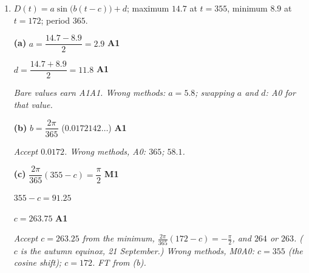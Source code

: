 \documentclass[12pt, twoside]{article}
\begin{document}
\begin{enumerate}[itemsep=0.3cm]
\textbf{(b)} $\dfrac{AD}{\sin 52^\circ} = \dfrac{11.8562\ldots}{\sin 70^\circ}$
\hfill \textbf{M1A1}

$AD = 9.94\,\text{cm}$ \quad ($9.94248\ldots$) \hfill \textbf{A1}

\emph{A1 for pairing $AD$ with $52^\circ$ and $AC$ with $70^\circ$. Accept
any value consistent with the candidate's rounded $AC$, e.g.\ $9.98$ from
$AC = 11.9$. Wrong method: pairing $AD$ with $70^\circ$ gives $14.1$:
M1A0A0. FT from (a).}

\textbf{(c)} $C\hat{A}D = 180^\circ - 52^\circ - 70^\circ = 58^\circ$

$\text{Area } ABC = \frac{1}{2}(8)(6)\sin 115^\circ = 21.7513\ldots$

$\text{Area } ACD = \frac{1}{2}(11.8562\ldots)(9.94248\ldots)\sin 58^\circ
= 49.9843\ldots$ \hfill \textbf{M1}

$\text{Area } ABCD = 21.7513\ldots + 49.9843\ldots$ \hfill \textbf{M1}

$\text{Area } ABCD = 71.7\,\text{cm}^{2}$ \quad ($71.7356\ldots$)
\hfill \textbf{A1}

\emph{As version (a). Accept $72.1$ from $AC = 11.9$ and $AD = 9.98$.
Wrong method: $115^\circ$ in triangle $ACD$ gives $75.2$: M1M1A0. FT from
(a) and (b).}

\newpage

\item[4.] [Maximum mark: 12]

$D(t) = a\sin\bigl(b(t - c)\bigr) + d$; maximum $14.7$ at $t = 355$,
minimum $8.9$ at $t = 172$; period $365$.

\textbf{(a)} $a = \dfrac{14.7 - 8.9}{2} = 2.9$ \hfill \textbf{A1}

$d = \dfrac{14.7 + 8.9}{2} = 11.8$ \hfill \textbf{A1}

\emph{Bare values earn A1A1. Wrong methods: $a = 5.8$; swapping $a$ and
$d$: A0 for that value.}

\textbf{(b)} $b = \dfrac{2\pi}{365}$ \quad ($0.0172142\ldots$) \hfill \textbf{A1}

\emph{Accept $0.0172$. Wrong methods, A0: $365$; $58.1$.}

\textbf{(c)} $\dfrac{2\pi}{365}(355 - c) = \dfrac{\pi}{2}$ \hfill \textbf{M1}

$355 - c = 91.25$

$c = 263.75$ \hfill \textbf{A1}

\emph{Accept $c = 263.25$ from the minimum,
$\frac{2\pi}{365}(172 - c) = -\frac{\pi}{2}$, and $264$ or $263$.
($c$ is the autumn equinox, 21 September.) Wrong methods, M0A0: $c = 355$
(the cosine shift); $c = 172$. FT from (b).}


\end{enumerate}
\end{document}
